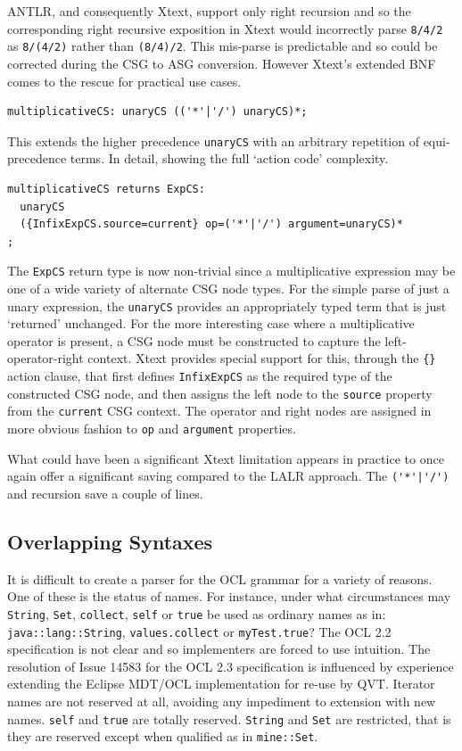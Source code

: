 \documentclass[runningheads,a4paper]{llncs}
\begin{document}
ANTLR, and consequently Xtext, support only right recursion and so the corresponding right recursive exposition in Xtext would incorrectly parse \verb+8/4/2+ as \verb+8/(4/2)+ rather than \verb+(8/4)/2+. This mis-parse is predictable and so could be corrected during the CSG to ASG conversion. However Xtext's extended BNF comes to the rescue for practical use cases.

{\small\begin{verbatim}
multiplicativeCS: unaryCS (('*'|'/') unaryCS)*;
\end{verbatim}}

This extends the higher precedence \verb+unaryCS+ with an arbitrary repetition of equi-precedence terms. In detail, showing the full `action code' complexity.

{\small\begin{verbatim}
multiplicativeCS returns ExpCS:
  unaryCS
  ({InfixExpCS.source=current} op=('*'|'/') argument=unaryCS)*
;
\end{verbatim}}

The \verb+ExpCS+ return type is now non-trivial since a multiplicative expression may be one of a wide variety of alternate CSG node types. For the simple parse of just a unary expression, the \verb+unaryCS+ provides an appropriately typed term that is just `returned' unchanged. For the more interesting case where a multiplicative operator is present, a CSG node must be constructed to capture the left-operator-right context. Xtext provides special support for this, through the \verb+{}+ action clause, that first defines \verb+InfixExpCS+ as the required type of the constructed CSG node, and then assigns the left node to the \verb+source+ property from the \verb+current+ CSG context. The operator and right nodes are assigned in more obvious fashion to \verb+op+ and \verb+argument+ properties.

What could have been a significant Xtext limitation appears in practice to once again offer a significant saving compared to the LALR approach. The \verb+('*'|'/')+ and recursion save a couple of lines.

\subsection{Overlapping Syntaxes}

It is difficult to create a parser for the OCL grammar for a variety of reasons. One of these is the status of names. For instance, under what circumstances may \verb+String+,  \verb+Set+,  \verb+collect+, \verb+self+ or \verb+true+ be used as ordinary names as in: \verb+java::lang::String+, \verb+values.collect+ or \verb+myTest.true+? The OCL 2.2 specification is not clear and so implementers are forced to use intuition. The resolution of Issue 14583\cite{OCL2.3} for the OCL 2.3 specification is influenced by experience extending the Eclipse MDT/OCL implementation for re-use by QVT. Iterator names are not reserved at all, avoiding any impediment to extension with new names. \verb+self+ and \verb+true+ are totally reserved. \verb+String+ and \verb+Set+ are restricted, that is they are reserved except when qualified as in \verb+mine::Set+.
\end{document}
